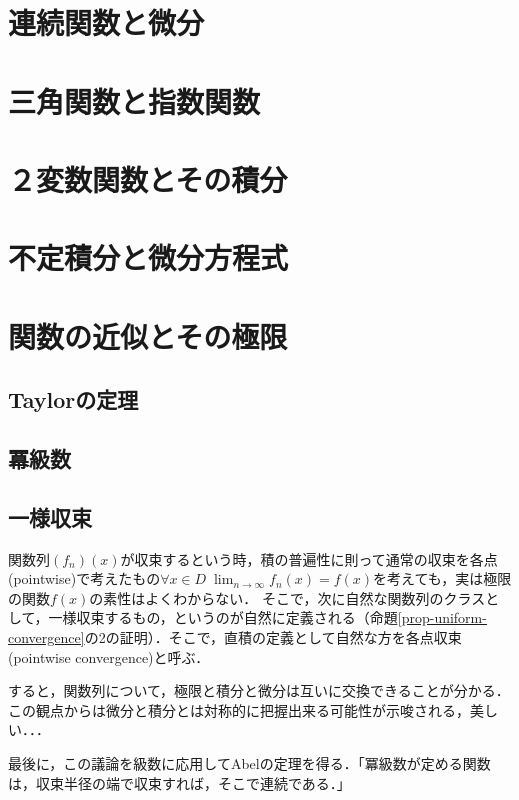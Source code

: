 \documentclass[uplatex, dvipdfmx]{jsreport}
\begin{document}
\chapter{連続関数と微分}

\chapter{三角関数と指数関数}

\chapter{２変数関数とその積分}

\chapter{不定積分と微分方程式}

\chapter{関数の近似とその極限}

\section{Taylorの定理}

\section{冪級数}

\section{一様収束}
関数列$(f_n)(x)$が収束するという時，積の普遍性に則って通常の収束を各点(pointwise)で考えたもの$\forall x\in D\; \lim_{n\to\infty}f_n(x)=f(x)$を考えても，実は極限の関数$f(x)$の素性はよくわからない．
そこで，次に自然な関数列のクラスとして，一様収束するもの，というのが自然に定義される（命題\ref{prop-uniform-convergence}の2の証明）．そこで，直積の定義として自然な方を各点収束(pointwise convergence)と呼ぶ．

すると，関数列について，極限と積分と微分は互いに交換できることが分かる．この観点からは微分と積分とは対称的に把握出来る可能性が示唆される，美しい．．．

最後に，この議論を級数に応用してAbelの定理を得る．「冪級数が定める関数は，収束半径の端で収束すれば，そこで連続である．」
\end{document}
